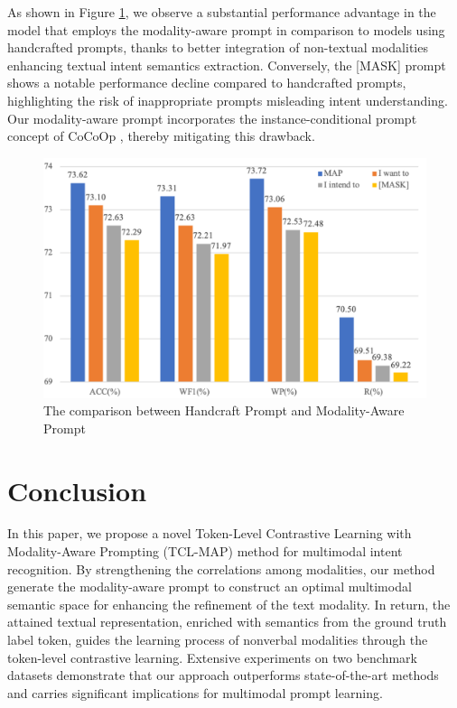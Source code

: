 \documentclass[letterpaper]{article} %
\begin{document}
As shown in Figure \ref{analyze}, we observe a substantial performance advantage in the model that employs the modality-aware prompt in comparison to models using handcrafted prompts, thanks to better integration of non-textual modalities enhancing textual intent semantics extraction. Conversely, the [MASK] prompt shows a notable performance decline compared to handcrafted prompts, highlighting the risk of inappropriate prompts misleading intent understanding. Our modality-aware prompt incorporates the instance-conditional prompt concept of CoCoOp \cite{zhou2022conditional}, thereby mitigating this drawback.

\begin{figure}[t!]
\centering
\includegraphics[scale=.29]{Figs/analyze.pdf}
\caption{\protect \label{analyze} The comparison between Handcraft Prompt and Modality-Aware Prompt
}
\end{figure}

\vspace{-2.48mm}
\section{Conclusion}
In this paper, we propose a novel Token-Level Contrastive Learning with Modality-Aware Prompting (TCL-MAP) method for multimodal intent recognition. By strengthening the correlations among modalities, our method generate the modality-aware prompt to construct an optimal multimodal semantic space for enhancing the refinement of the text modality. In return, the attained textual representation, enriched with semantics from the ground truth label token, guides the learning process of nonverbal modalities through the token-level contrastive learning. Extensive experiments on two benchmark datasets demonstrate that our approach outperforms state-of-the-art methods and carries significant implications for multimodal prompt learning.
\end{document}
